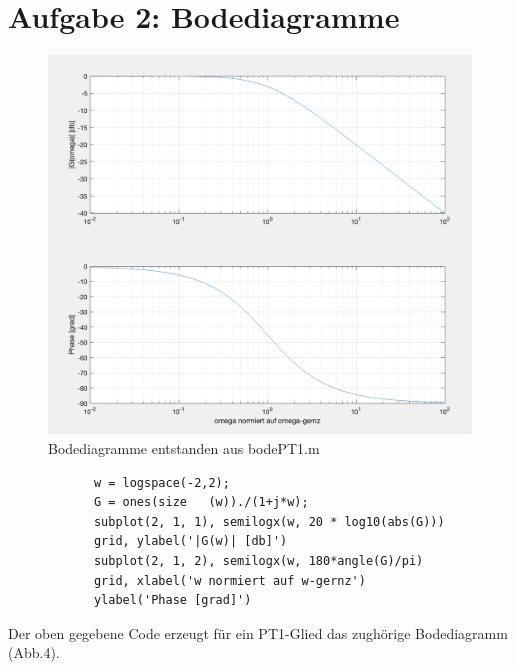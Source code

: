 \documentclass{article}
\begin{document}
	\section{Aufgabe 2: Bodediagramme}
		\begin{figure}[h]
 		 	\includegraphics[scale=0.3]{./Bodediagramme.png}
			\caption{Bodediagramme entstanden aus bodePT1.m}
			\label{fig1: Bodediagramm1}
		\end{figure}
		\begin{lstlisting}
			w = logspace(-2,2);
			G = ones(size	(w))./(1+j*w);
			subplot(2, 1, 1), semilogx(w, 20 * log10(abs(G)))
			grid, ylabel('|G(w)| [db]')
			subplot(2, 1, 2), semilogx(w, 180*angle(G)/pi)
			grid, xlabel('w normiert auf w-gernz')
			ylabel('Phase [grad]')
		\end{lstlisting}
		Der oben gegebene Code erzeugt für ein PT1-Glied das zughörige Bodediagramm (Abb.4).
\end{document}
